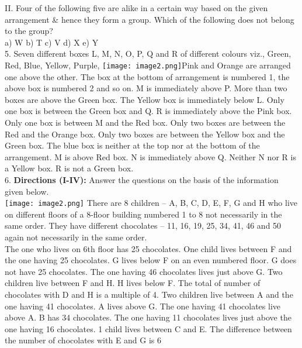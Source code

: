 \documentclass[
]{article}
\begin{document}
II. Four of the following five are alike in a certain way based on the given arrangement &
hence they form a group. Which of the following does not belong to the group?\\
a) W \hspace{2mm}b) T \hspace{2mm}c) V \hspace{2mm}d) X \hspace{2mm}e) Y\\

5. Seven different boxes L, M, N, O, P, Q and R of different colours viz., Green, Red, Blue,
Yellow, Purple, \texttt{[image: image2.png]}Pink and Orange are arranged one above the other. The box at the bottom of
arrangement is numbered 1, the above box is numbered 2 and so on. M is immediately
above P. More than two boxes are above the Green box. The Yellow box is immediately
below L. Only one box is between the Green box and Q. R is immediately above the Pink
box. Only one box is between M and the Red box. Only two boxes are between the Red and
the Orange box. Only two boxes are between the Yellow box and the Green box. The blue
box is neither at the top nor at the bottom of the arrangement. M is above Red box. N is
immediately above Q. Neither N nor R is a Yellow box. R is not a Green box.\\

6. \textbf{Directions (I-IV):} Answer the questions on the basis of the information given below.\\
\texttt{[image: image2.png]}
There are 8 children – A, B, C, D, E, F, G and H who live on different floors of a 8-floor
building numbered 1 to 8 not necessarily in the same order. They have different chocolates –
11, 16, 19, 25, 34, 41, 46 and 50 again not necessarily in the same order.\\
The one who lives on 6th floor has 25 chocolates. One child lives between F and the one
having 25 chocolates. G lives below F on an even numbered floor. G does not have 25
chocolates. The one having 46 chocolates lives just above G. Two children live between F
and H. H lives below F. The total of number of chocolates with D and H is a multiple of 4.
Two children live between A and the one having 41 chocolates. A lives above G. The one
having 41 chocolates live above A. B has 34 chocolates. The one having 11 chocolates lives
just above the one having 16 chocolates. 1 child lives between C and E. The difference
between the number of chocolates with E and G is 6\\
\end{document}
